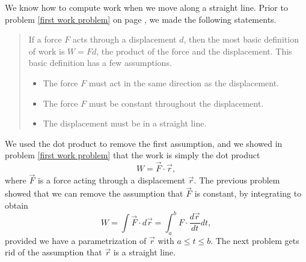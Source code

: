 We know how to compute work when we move along a straight line. Prior to problem \ref{first work problem} on page \pageref{first work problem}, we made the following statements. 
\begin{quote}If a force $F$ acts through a displacement $d$, then the most basic definition of work is $W=Fd$, the product of the force and the displacement.  This basic definition has a few assumptions.
\begin{itemize}
\item The force $F$ must act in the same direction as the displacement.
\item The force $F$ must be constant throughout the  displacement.
\item The displacement must be in a straight line.
\end{itemize}
\end{quote}
We used the dot product to remove the first assumption, and we showed in problem \ref{first work problem} that the work is simply the dot product $$W=\vec F\cdot \vec r,$$
where $\vec F$ is a force acting through a displacement $\vec r$. The previous problem showed that we can remove the assumption that $\vec F$ is constant, by integrating to obtain $$W=\int \vec F \cdot d\vec r = \int_a^b F\cdot \frac{d\vec r}{dt}dt, $$ provided we have a parametrization of $\vec r$ with $a\leq t\leq b$. The next problem gets rid of the assumption that $\vec r$ is a straight line.  


